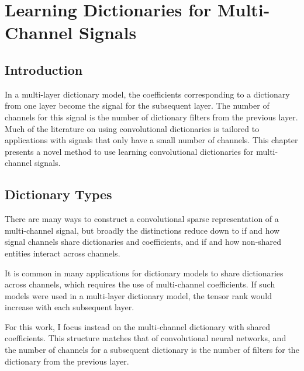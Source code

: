 \chapter{Learning Dictionaries for Multi-Channel Signals}

\section{Introduction}
In a multi-layer dictionary model, the coefficients corresponding to a dictionary from one layer become the signal for the subsequent layer.  The number of channels for this signal is the number of dictionary filters from the previous layer.  Much of the literature on using convolutional dictionaries is tailored to applications with signals that only have a small number of channels.  This chapter presents a novel method to use learning convolutional dictionaries for multi-channel signals. 
\section{Dictionary Types}
There are many ways to construct a convolutional sparse representation of a multi-channel signal, but broadly the distinctions reduce down to if and how signal channels share dictionaries and coefficients, and if and how non-shared entities interact across channels.

It is common in many applications for dictionary models to share dictionaries across channels, which requires the use of multi-channel coefficients. If such models were used in a multi-layer dictionary model, the tensor rank would increase with each subsequent layer.

For this work, I focus instead on the multi-channel dictionary with shared coefficients. This structure matches that of convolutional neural networks, and the number of channels for a subsequent dictionary is the number of filters for the dictionary from the previous layer.

